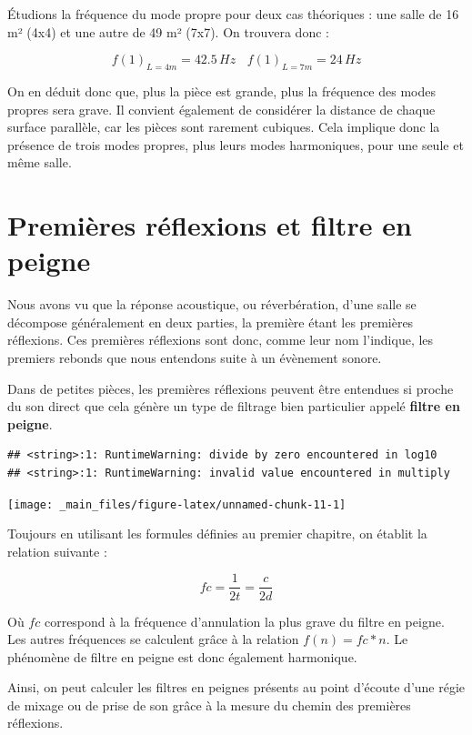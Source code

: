 \documentclass[
]{book}
\begin{document}
Étudions la fréquence du mode propre pour deux cas théoriques : une salle de 16 m² (4x4) et une autre de 49 m² (7x7). On trouvera donc :

\[f(1)_{L=4m} = 42.5 \,Hz \>\>\>\> f(1)_{L=7m} = 24 \,Hz\]

On en déduit donc que, plus la pièce est grande, plus la fréquence des modes propres sera grave. Il convient également de considérer la distance de chaque surface parallèle, car les pièces sont rarement cubiques. Cela implique donc la présence de trois modes propres, plus leurs modes harmoniques, pour une seule et même salle.

\hypertarget{premiuxe8res-ruxe9flexions-et-filtre-en-peigne}{%
\section{Premières réflexions et filtre en peigne}\label{premiuxe8res-ruxe9flexions-et-filtre-en-peigne}}

Nous avons vu que la réponse acoustique, ou réverbération, d'une salle se décompose généralement en deux parties, la première étant les premières réflexions. Ces premières réflexions sont donc, comme leur nom l'indique, les premiers rebonds que nous entendons suite à un évènement sonore.

Dans de petites pièces, les premières réflexions peuvent être entendues si proche du son direct que cela génère un type de filtrage bien particulier appelé \textbf{filtre en peigne}.

\begin{verbatim}
## <string>:1: RuntimeWarning: divide by zero encountered in log10
## <string>:1: RuntimeWarning: invalid value encountered in multiply
\end{verbatim}

\begin{center}\texttt{[image: \_main\_files/figure-latex/unnamed-chunk-11-1]} \end{center}

Toujours en utilisant les formules définies au premier chapitre, on établit la relation suivante :

\[ fc = \frac 1{2t} = \frac c{2d} \]

Où \(fc\) correspond à la fréquence d'annulation la plus grave du filtre en peigne. Les autres fréquences se calculent grâce à la relation \(f(n) = fc*n\). Le phénomène de filtre en peigne est donc également harmonique.

Ainsi, on peut calculer les filtres en peignes présents au point d'écoute d'une régie de mixage ou de prise de son grâce à la mesure du chemin des premières réflexions.
\end{document}
